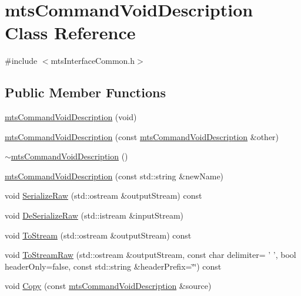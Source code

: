\hypertarget{classmts_command_void_description}{\section{mts\-Command\-Void\-Description Class Reference}
\label{classmts_command_void_description}
}


{\ttfamily \#include $<$mts\-Interface\-Common.\-h$>$}

\subsection*{Public Member Functions}
\begin{DoxyCompactItemize}
\item 
\hyperlink{classmts_command_void_description_a5bc3aaec85b7b36e4ff84c63d8deae5f}{mts\-Command\-Void\-Description} (void)
\item 
\hyperlink{classmts_command_void_description_a9d040531c92ea4c8b02acd69031775e1}{mts\-Command\-Void\-Description} (const \hyperlink{classmts_command_void_description}{mts\-Command\-Void\-Description} \&other)
\item 
\hyperlink{classmts_command_void_description_a13158a67e2f4eba24a026a8771b43ee4}{$\sim$mts\-Command\-Void\-Description} ()
\item 
\hyperlink{classmts_command_void_description_a76e960109615ad44e99ab5bdde8369f8}{mts\-Command\-Void\-Description} (const std\-::string \&new\-Name)
\item 
void \hyperlink{classmts_command_void_description_a340a0e0c0143ddc712a10eaf48c478ed}{Serialize\-Raw} (std\-::ostream \&output\-Stream) const 
\item 
void \hyperlink{classmts_command_void_description_a39b8a55124bff411f5b7a6adbed0f306}{De\-Serialize\-Raw} (std\-::istream \&input\-Stream)
\item 
void \hyperlink{classmts_command_void_description_afca052335615fb80fa73ff7a2a64e10e}{To\-Stream} (std\-::ostream \&output\-Stream) const 
\item 
void \hyperlink{classmts_command_void_description_aed5f7ee865cf462b23334ba1ff451ddd}{To\-Stream\-Raw} (std\-::ostream \&output\-Stream, const char delimiter= ' ', bool header\-Only=false, const std\-::string \&header\-Prefix=\char`\"{}\char`\"{}) const 
\item 
void \hyperlink{classmts_command_void_description_ac85ea01d42186b9ff3edd54ac348b84d}{Copy} (const \hyperlink{classmts_command_void_description}{mts\-Command\-Void\-Description} \&source)

\end{DoxyCompactItemize}
